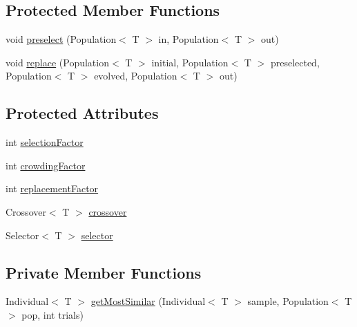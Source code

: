\subsection*{Protected Member Functions}
\begin{DoxyCompactItemize}
\item 
void \hyperlink{classjenes_1_1stage_1_1operator_1_1common_1_1_multi_niche_crowder_3_01_t_01extends_01_chromosome_01_4_ae3e96b6cd96f375209e9308bb7f9ca85}{preselect} (Population$<$ T $>$ in, Population$<$ T $>$ out)
\item 
void \hyperlink{classjenes_1_1stage_1_1operator_1_1common_1_1_multi_niche_crowder_3_01_t_01extends_01_chromosome_01_4_a619884821dabf179aed435269366114e}{replace} (Population$<$ T $>$ initial, Population$<$ T $>$ preselected, Population$<$ T $>$ evolved, Population$<$ T $>$ out)
\end{DoxyCompactItemize}
\subsection*{Protected Attributes}
\begin{DoxyCompactItemize}
\item 
int \hyperlink{classjenes_1_1stage_1_1operator_1_1common_1_1_multi_niche_crowder_3_01_t_01extends_01_chromosome_01_4_ab561927a8af185e69bd5fcf85e904d7a}{selection\-Factor}
\item 
int \hyperlink{classjenes_1_1stage_1_1operator_1_1common_1_1_multi_niche_crowder_3_01_t_01extends_01_chromosome_01_4_ad7320907a72bd19c028f922383667560}{crowding\-Factor}
\item 
int \hyperlink{classjenes_1_1stage_1_1operator_1_1common_1_1_multi_niche_crowder_3_01_t_01extends_01_chromosome_01_4_a9a068eae86d3af67f89cfa4b244810fb}{replacement\-Factor}
\item 
Crossover$<$ T $>$ \hyperlink{classjenes_1_1stage_1_1operator_1_1common_1_1_multi_niche_crowder_3_01_t_01extends_01_chromosome_01_4_ad584be099b23576ec3379a6867d31ef4}{crossover}
\item 
Selector$<$ T $>$ \hyperlink{classjenes_1_1stage_1_1operator_1_1common_1_1_multi_niche_crowder_3_01_t_01extends_01_chromosome_01_4_aec9f82fc79b7a63f5e664dfbcc7e9563}{selector}
\end{DoxyCompactItemize}
\subsection*{Private Member Functions}
\begin{DoxyCompactItemize}
\item 
Individual$<$ T $>$ \hyperlink{classjenes_1_1stage_1_1operator_1_1common_1_1_multi_niche_crowder_3_01_t_01extends_01_chromosome_01_4_a118b6eae620e82ec9409280e565a947d}{get\-Most\-Similar} (Individual$<$ T $>$ sample, Population$<$ T $>$ pop, int trials)
\end{DoxyCompactItemize}


